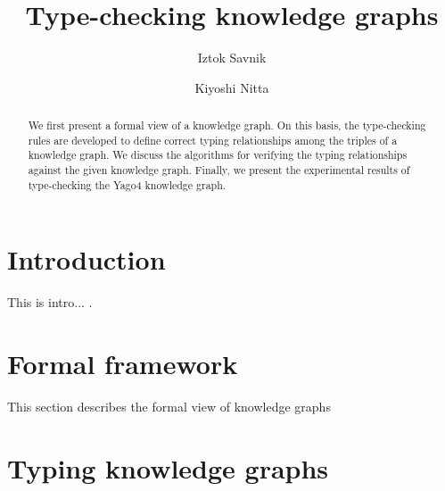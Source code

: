 \documentclass[runningheads]{llncs}
\begin{document}
\title{Type-checking knowledge graphs}

\author{Iztok Savnik \and Kiyoshi Nitta} 



\maketitle

\begin{abstract}
  We first present a formal view of a knowledge graph. On this basis,
  the type-checking rules are developed to define correct typing
  relationships among the triples of a knowledge graph. We discuss the
  algorithms for verifying the typing relationships against the given
  knowledge graph. Finally, we present the experimental results of
  type-checking the Yago4 knowledge graph.

\end{abstract}


\thispagestyle{headings}
\tableofcontents
\newpage

\section{Introduction}

This is intro... \cite{Hogan22KGsSurveyCsur}.

\section{Formal framework}

This section describes the formal view of knowledge graphs 

\section{Typing knowledge graphs}
\end{document}

